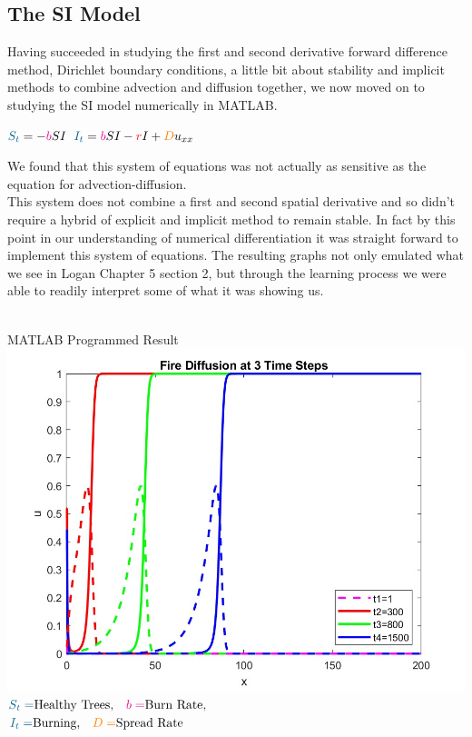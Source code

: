 \documentclass{article}
\begin{document}
\subsection{The SI Model}
Having succeeded in studying the first and second derivative forward difference method, Dirichlet boundary conditions, a little bit about stability and implicit methods to combine advection and diffusion together, we now moved on to studying the SI model numerically in MATLAB.\\
\begin{center}
    $\textcolor{MidnightBlue}{S_t} = -\textcolor{magenta}{b}SI$\qquad
    $\textcolor{MidnightBlue}{I_t} = \textcolor{magenta}{b}SI-\textcolor{red}{r}I+\textcolor{orange}{D}u_{xx}$
\end{center}
We found that this system of equations was not actually as sensitive as the equation for advection-diffusion.\\
This system does not combine a first and second spatial derivative and so didn't require a hybrid of explicit and implicit method to remain stable. In fact by this point in our understanding of numerical differentiation it was straight forward to implement this system of equations.  The resulting graphs not only emulated what we see in Logan Chapter 5 section 2, but through the learning process we were able to readily interpret some of what it was showing us.\\\\
    \begin{minipage}[t]{.49\textwidth}
    \centering
    MATLAB Programmed Result
    \includegraphics[scale=0.20]{Step1_HS_Gaussian_Advection_Diffusion_3_timestamps.jpg}
    $\textcolor{MidnightBlue}{S_t=}\text{Healthy Trees,}\quad\textcolor{magenta}{b=}\text{Burn Rate,}$\\
    $\textcolor{MidnightBlue}{I_t=}\text{Burning,}\quad\textcolor{orange}{D=}\text{Spread Rate}$
    \end{minipage}
\end{document}
